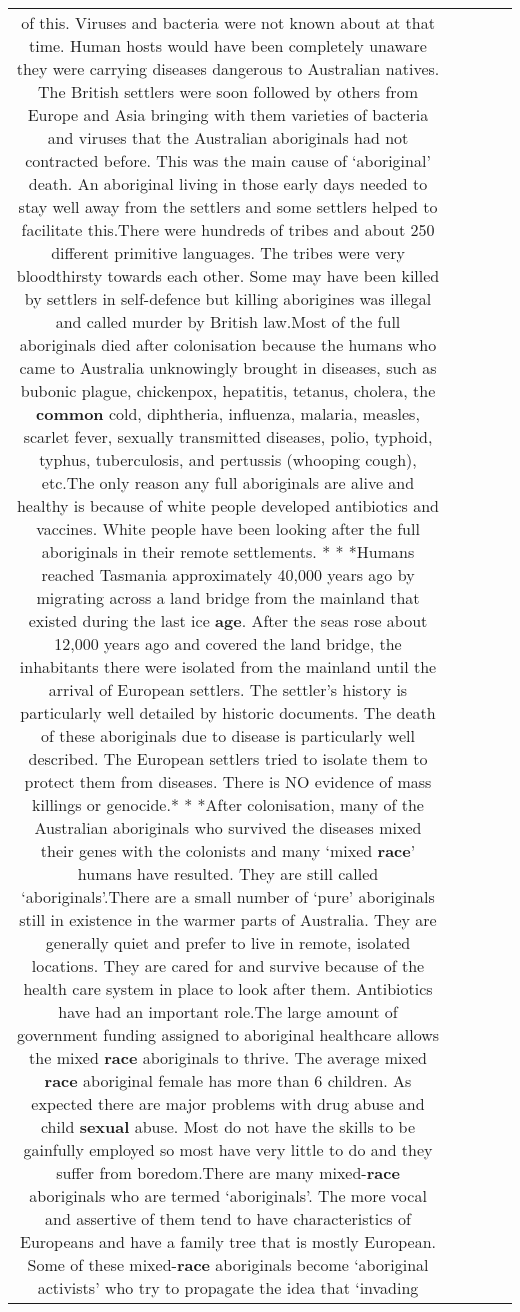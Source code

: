 \documentclass[11pt]{article}
\newlength\mylength
\begin{document}
\begin{center}
\begin{longtable}{|C{.65\mylength}|C{.30\mylength}|C{.12\mylength}|C{.12\mylength}|C{.12\mylength}|}
of this. Viruses and bacteria were not known about at that time. Human hosts would have been completely unaware they were carrying diseases dangerous to Australian natives. The British settlers were soon followed by others from Europe and Asia bringing with them varieties of bacteria and viruses that the Australian aboriginals had not contracted before. This was the main cause of ‘aboriginal' death. An aboriginal living in those early days needed to stay well away from the settlers and some settlers helped to facilitate this.There were hundreds of tribes and about 250 different primitive languages. The tribes were very bloodthirsty towards each other. Some may have been killed by settlers in self-defence but killing aborigines was illegal and called murder by British law.Most of the full aboriginals died after colonisation because the humans who came to Australia unknowingly brought in diseases, such as bubonic plague, chickenpox, hepatitis, tetanus, cholera, the \textbf{common} cold, diphtheria, influenza, malaria, measles, scarlet fever, sexually transmitted diseases, polio, typhoid, typhus, tuberculosis, and pertussis (whooping cough), etc.The only reason any full aboriginals are alive and healthy is because of white people developed antibiotics and vaccines. White people have been looking after the full aboriginals in their remote settlements. * * *Humans reached Tasmania approximately 40,000 years ago by migrating across a land bridge from the mainland that existed during the last ice \textbf{age}. After the seas rose about 12,000 years ago and covered the land bridge, the inhabitants there were isolated from the mainland until the arrival of European settlers. The settler's history is particularly well detailed by historic documents. The death of these aboriginals due to disease is particularly well described. The European settlers tried to isolate them to protect them from diseases. There is NO evidence of mass killings or genocide.* * *After colonisation, many of the Australian aboriginals who survived the diseases mixed their genes with the colonists and many ‘mixed \textbf{race}' humans have resulted. They are still called ‘aboriginals'.There are a small number of ‘pure' aboriginals still in existence in the warmer parts of Australia. They are generally quiet and prefer to live in remote, isolated locations. They are cared for and survive because of the health care system in place to look after them. Antibiotics have had an important role.The large amount of government funding assigned to aboriginal healthcare allows the mixed \textbf{race} aboriginals to thrive. The average mixed \textbf{race} aboriginal female has more than 6 children. As expected there are major problems with drug abuse and child \textbf{sexual} abuse. Most do not have the skills to be gainfully employed so most have very little to do and they suffer from boredom.There are many mixed-\textbf{race} aboriginals who are termed ‘aboriginals'. The more vocal and assertive of them tend to have characteristics of Europeans and have a family tree that is mostly European. Some of these mixed-\textbf{race} aboriginals become ‘aboriginal activists' who try to propagate the idea that ‘invading 
\end{longtable}
\end{center}
\end{document}

